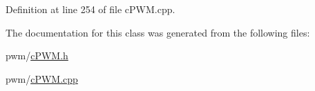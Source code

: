 \-Definition at line 254 of file c\-P\-W\-M.\-cpp.



\-The documentation for this class was generated from the following files\-:\begin{DoxyCompactItemize}
\item 
pwm/\hyperlink{c_p_w_m_8h}{c\-P\-W\-M.\-h}\item 
pwm/\hyperlink{c_p_w_m_8cpp}{c\-P\-W\-M.\-cpp}\end{DoxyCompactItemize}

